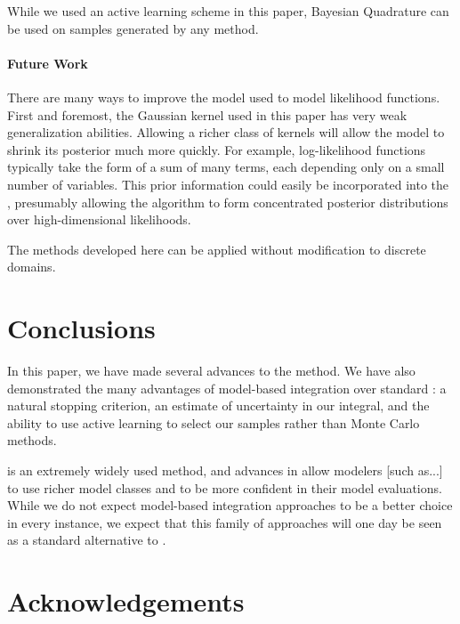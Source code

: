 \documentclass{article}
\begin{document}
While we used an active learning scheme in this paper, Bayesian Quadrature can be used on samples generated by any method.

\paragraph{Future Work}There are many ways to improve the \gpb model used to model likelihood functions.  First and foremost, the Gaussian kernel used in this paper has very weak generalization abilities.  Allowing a richer class of kernels will allow the \gpb model to shrink its posterior much more quickly.  For example, log-likelihood functions typically take the form of a sum of many terms, each depending only on a small number of variables.  This prior information could easily be incorporated into the \gp, presumably allowing the  algorithm to form concentrated posterior distributions over high-dimensional likelihoods.

The methods developed here can be applied without modification to discrete domains.

\section{Conclusions}

 In this paper, we have made several advances to the  method.  We have also demonstrated the many advantages of model-based integration over standard : a natural stopping criterion, an estimate of uncertainty in our integral, and the ability to use active learning to select our samples rather than Monte Carlo methods.

 is an extremely widely used method, and advances in  allow modelers [such as...] to use richer model classes and to be more confident in their model evaluations.  While we do not expect model-based integration approaches to be a better choice in every instance, we expect that this family of approaches will one day be seen as a standard alternative to .

\section*{Acknowledgements}



\pagebreak


\end{document}
